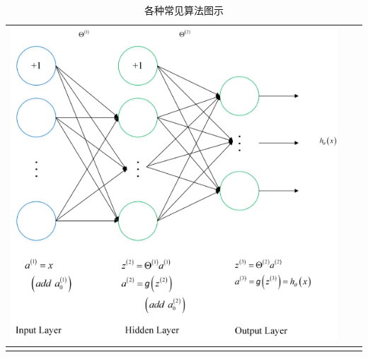 \begin{longtable}[]{ccc}
\begin{minipage}{1.0\linewidth}
\includegraphics[width=1.0\linewidth]{./img/ch2/ren.png}  
\end{minipage}
\tabularnewline
\bottomrule
\caption{各种常见算法图示}
\end{longtable}

